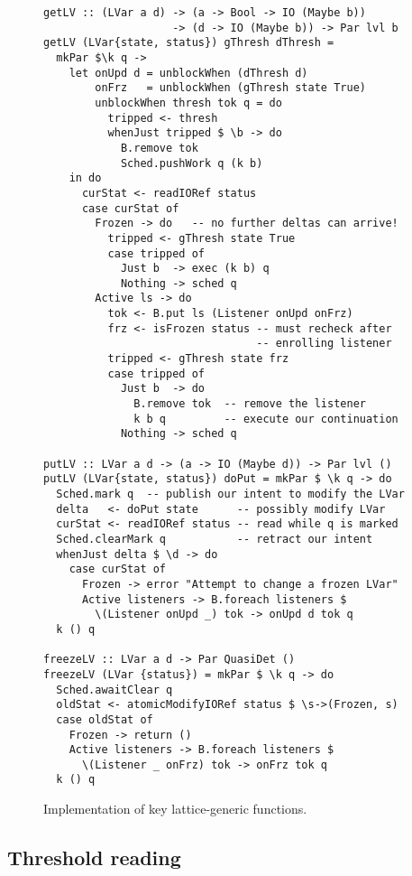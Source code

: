 \begin{figure}
\lstset{basicstyle=\footnotesize\ttfamily}
\begin{lstlisting}
getLV :: (LVar a d) -> (a -> Bool -> IO (Maybe b)) 
                    -> (d -> IO (Maybe b)) -> Par lvl b
getLV (LVar{state, status}) gThresh dThresh = 
  mkPar $\k q -> 
    let onUpd d = unblockWhen (dThresh d)
        onFrz   = unblockWhen (gThresh state True)
        unblockWhen thresh tok q = do
          tripped <- thresh
          whenJust tripped $ \b -> do
            B.remove tok
            Sched.pushWork q (k b)                     
    in do
      curStat <- readIORef status
      case curStat of
        Frozen -> do   -- no further deltas can arrive!
          tripped <- gThresh state True
          case tripped of
            Just b  -> exec (k b) q
            Nothing -> sched q     
        Active ls -> do
          tok <- B.put ls (Listener onUpd onFrz)
          frz <- isFrozen status -- must recheck after
                                 -- enrolling listener
          tripped <- gThresh state frz
          case tripped of
            Just b  -> do
              B.remove tok  -- remove the listener 
              k b q         -- execute our continuation
            Nothing -> sched q

putLV :: LVar a d -> (a -> IO (Maybe d)) -> Par lvl ()
putLV (LVar{state, status}) doPut = mkPar $ \k q -> do  
  Sched.mark q  -- publish our intent to modify the LVar
  delta   <- doPut state      -- possibly modify LVar
  curStat <- readIORef status -- read while q is marked
  Sched.clearMark q           -- retract our intent
  whenJust delta $ \d -> do
    case curStat of
      Frozen -> error "Attempt to change a frozen LVar"
      Active listeners -> B.foreach listeners $ 
        \(Listener onUpd _) tok -> onUpd d tok q
  k () q 

freezeLV :: LVar a d -> Par QuasiDet ()
freezeLV (LVar {status}) = mkPar $ \k q -> do
  Sched.awaitClear q
  oldStat <- atomicModifyIORef status $ \s->(Frozen, s)    
  case oldStat of
    Frozen -> return ()
    Active listeners -> B.foreach listeners $ 
      \(Listener _ onFrz) tok -> onFrz tok q
  k () q
\end{lstlisting}
\caption{Implementation of key lattice-generic functions.}\label{fig:implementation}
\end{figure}

\subsection{Threshold reading}

